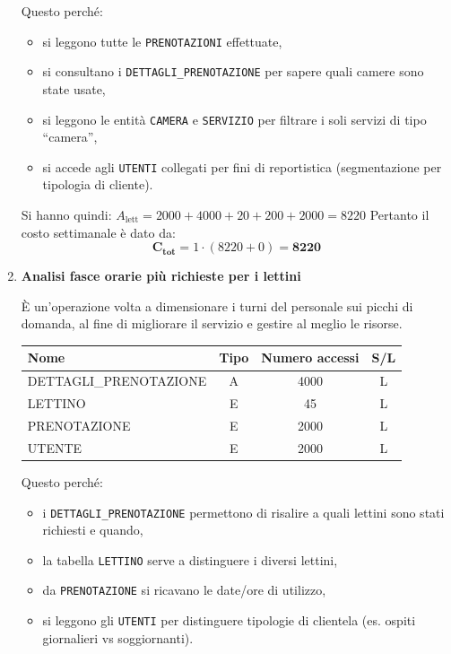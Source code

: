 \documentclass[a4paper,12pt]{report}
\begin{document}
\begin{enumerate}
	      Questo perché:
	      \begin{itemize}
		      \item si leggono tutte le \texttt{PRENOTAZIONI} effettuate,
		      \item si consultano i \texttt{DETTAGLI\_PRENOTAZIONE} per sapere quali camere sono state usate,
		      \item si leggono le entità \texttt{CAMERA} e \texttt{SERVIZIO} per filtrare i soli servizi di tipo “camera”,
		      \item si accede agli \texttt{UTENTI} collegati per fini di reportistica (segmentazione per tipologia di cliente).
	      \end{itemize}

	      Si hanno quindi: $A_{\text{lett}} = 2000 + 4000 + 20 + 200 + 2000 = 8220$
	      Pertanto il costo settimanale è dato da:
	      $$
		      \mathbf{C_{tot}} = 1 \cdot (8220 + 0) = \mathbf{8220}
	      $$


	\item {\large \textbf{Analisi fasce orarie più richieste per i lettini}} \label{op11}

	      È un'operazione volta a dimensionare i turni del personale sui picchi di domanda, al fine di migliorare il servizio e gestire al meglio le risorse.

	      \begin{table}[H]
		      \centering
		      \small
		      \renewcommand{\arraystretch}{1.15}
		      \begin{tabularx}{0.8\textwidth}{|X|c|c|c|}
			      \hline
			      \rowcolor{gray!20}
			      \textbf{Nome}          & \textbf{Tipo} & \textbf{Numero accessi} & \textbf{S/L} \\
			      \hline
			      DETTAGLI\_PRENOTAZIONE & A             & 4000                    & L            \\
			      LETTINO                & E             & 45                      & L            \\
			      PRENOTAZIONE           & E             & 2000                    & L            \\
			      UTENTE                 & E             & 2000                    & L            \\
			      \hline
		      \end{tabularx}
	      \end{table}

	      Questo perché:
	      \begin{itemize}
		      \item i \texttt{DETTAGLI\_PRENOTAZIONE} permettono di risalire a quali lettini sono stati richiesti e quando,
		      \item la tabella \texttt{LETTINO} serve a distinguere i diversi lettini,
		      \item da \texttt{PRENOTAZIONE} si ricavano le date/ore di utilizzo,
		      \item si leggono gli \texttt{UTENTI} per distinguere tipologie di clientela (es. ospiti giornalieri vs soggiornanti).
	      \end{itemize}


\end{enumerate}
\end{document}
